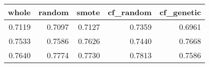 \begin{tabular}{rrrrr}
\toprule

 whole &  random &  smote &  cf\_random &  cf\_genetic \\
\midrule

0.7119 &  0.7097 & 0.7127 &     0.7359 &      0.6961 \\
0.7533 &  0.7586 & 0.7626 &     0.7440 &      0.7668 \\
0.7640 &  0.7774 & 0.7730 &     0.7813 &      0.7586 \\

\bottomrule
\end{tabular}
